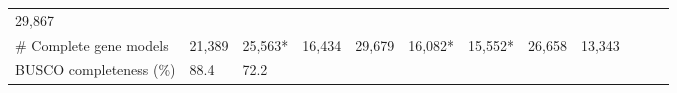 \documentclass[]{elsarticle} %
\begin{document}
\begin{longtable}[]{@{}llllllllllll@{}}
\begin{minipage}[t]{0.05\columnwidth}
29,867\strut
\end{minipage}\tabularnewline
\begin{minipage}[t]{0.15\columnwidth}\raggedright\strut
\# Complete gene models\strut
\end{minipage} & \begin{minipage}[t]{0.05\columnwidth}\raggedright\strut
21,389\strut
\end{minipage} & \begin{minipage}[t]{0.05\columnwidth}\raggedright\strut
25,563*\strut
\end{minipage} & \begin{minipage}[t]{0.05\columnwidth}\raggedright\strut
16,434\strut
\end{minipage} & \begin{minipage}[t]{0.05\columnwidth}\raggedright\strut
29,679\strut
\end{minipage} & \begin{minipage}[t]{0.05\columnwidth}\raggedright\strut
16,082*\strut
\end{minipage} & \begin{minipage}[t]{0.05\columnwidth}\raggedright\strut
15,552*\strut
\end{minipage} & \begin{minipage}[t]{0.05\columnwidth}\raggedright\strut
26,658\strut
\end{minipage} & \begin{minipage}[t]{0.05\columnwidth}\raggedright\strut
13,343\strut
\end{minipage} & \begin{minipage}[t]{0.05\columnwidth}\raggedright\strut
\strut
\end{minipage} & \begin{minipage}[t]{0.05\columnwidth}\raggedright\strut
\strut
\end{minipage} & \begin{minipage}[t]{0.05\columnwidth}\raggedright\strut
\strut
\end{minipage}\tabularnewline
\begin{minipage}[t]{0.15\columnwidth}\raggedright\strut
BUSCO completeness (\%)\strut
\end{minipage} & \begin{minipage}[t]{0.05\columnwidth}\raggedright\strut
88.4\strut
\end{minipage} & \begin{minipage}[t]{0.05\columnwidth}\raggedright\strut
72.2\strut
\end{minipage} & \begin{minipage}[t]{0.05\columnwidth}\raggedright\strut

\end{minipage}
\end{longtable}
\end{document}
